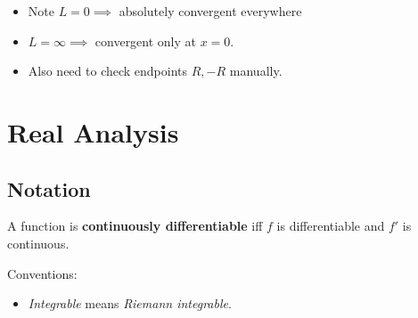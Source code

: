 \begin{remark}

\envlist

\begin{itemize}
\tightlist
\item
  Note \(L=0 \implies\) absolutely convergent everywhere
\item
  \(L = \infty \implies\) convergent only at \(x=0\).
\item
  Also need to check endpoints \(R, -R\) manually.
\end{itemize}

\end{remark}

\hypertarget{real-analysis}{%
\section{Real Analysis}\label{real-analysis}}

\hypertarget{notation-3}{%
\subsection{Notation}\label{notation-3}}

\begin{definition}

A function is \textbf{continuously differentiable} iff \(f\) is
differentiable and \(f'\) is continuous.

Conventions:

\begin{itemize}
\tightlist
\item
  \emph{Integrable} means \emph{Riemann integrable}.
\end{itemize}

\end{definition}

